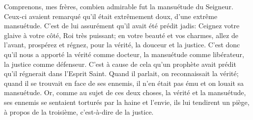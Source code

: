 Comprenons, mes frères, combien admirable fut la mansuétude du Seigneur.
Ceux-ci avaient remarqué qu’il était extrêmement doux,
	d’une extrême mansuétude.
C’est de lui assurément qu’il avait été prédit jadis:
	Ceignez votre glaive à votre côté, Roi très puissant;
	en votre beauté et vos charmes, allez de l’avant, prospérez et régnez,
	pour la vérité, la douceur et la justice.
C’est donc qu’il nous a apporté la vérité comme docteur,
	la mansuétude comme libérateur,
	la justice comme défenseur.
C’est à cause de cela qu’un prophète avait prédit
	qu’il régnerait dans l’Esprit Saint.
Quand il parlait, on reconnaissait la vérité;
	quand il se trouvait en face de ses ennemis, il n’en était pas ému
	et on louait sa mansuétude.
Or, comme au sujet de ces deux choses, la vérité et la mansuétude,
	ses ennemis se sentaient torturés par la haine et l’envie,
	ils lui tendirent un piège, à propos de la troisième,
		c’est-à-dire de la justice.
